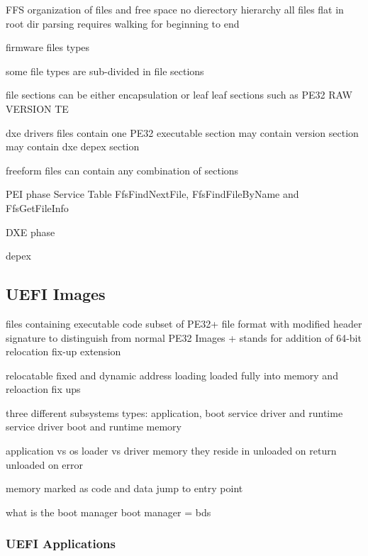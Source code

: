 \acf{FFS}
organization of files and free space
no dierectory hierarchy
all files flat in root dir
parsing requires walking for beginning to end

firmware files
types

some file types are sub-divided in file sections

file sections can be either
encapsulation or leaf
leaf sections such as
PE32
RAW
VERSION
TE

dxe drivers files
contain one PE32 executable section
may contain version section
may contain dxe depex section

freeform files
can contain any combination of sections

PEI phase Service Table
FfsFindNextFile, FfsFindFileByName and FfsGetFileInfo

DXE phase

depex

\cite{tianocore-edk2-build-spec}

\subsection{\acs{UEFI} Images}


files containing executable code
subset of PE32+ file format with modified header signature to distinguish from normal PE32 Images
+ stands for addition of 64-bit relocation fix-up extension

relocatable
fixed and dynamic address loading
loaded fully into memory and reloaction fix ups

three different subsystems types: application, boot service driver and runtime service driver
boot and runtime memory

application vs os loader vs driver
memory they reside in
unloaded on return
unloaded on error

memory marked as code and data
jump to entry point

what is the boot manager
boot manager = bds

\subsubsection{\acs{UEFI} Applications}


